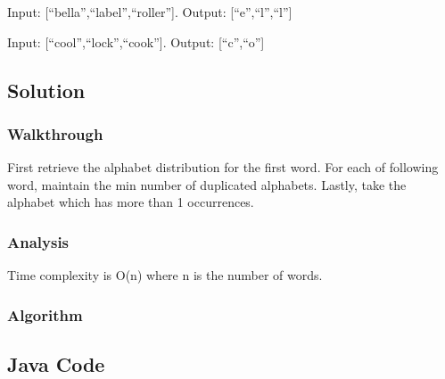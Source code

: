 \documentclass[]{book}
\begin{document}
Input: {[}``bella'',``label'',``roller''{]}. Output: {[}``e'',``l'',``l''{]}

Input: {[}``cool'',``lock'',``cook''{]}. Output: {[}``c'',``o''{]}

\hypertarget{solution-18}{%
\subsection{Solution}\label{solution-18}}

\hypertarget{walkthrough-22}{%
\subsubsection{Walkthrough}\label{walkthrough-22}}

First retrieve the alphabet distribution for the first word. For each of following word, maintain the min number
of duplicated alphabets. Lastly, take the alphabet which has more than 1 occurrences.

\hypertarget{analysis-24}{%
\subsubsection{Analysis}\label{analysis-24}}

Time complexity is O(n) where n is the number of words.

\hypertarget{algorithm-24}{%
\subsubsection{Algorithm}\label{algorithm-24}}

\hypertarget{java-code-20}{%
\subsection{Java Code}\label{java-code-20}}
\end{document}
